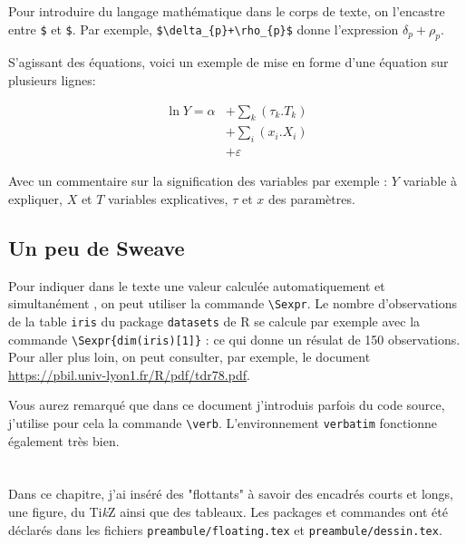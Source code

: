 Pour introduire du langage mathématique dans le corps de texte, on l'encastre entre \verb!$! et \verb!$!. Par exemple, \verb!$\delta_{p}+\rho_{p}$! donne l'expression $\delta_{p}+\rho_{p}$.

S'agissant des équations, voici un exemple de mise en forme d'une équation sur plusieurs lignes: 

\noindent\begin{minipage}{0.53\linewidth} 
\begin{equation}\label{eq:long}
\begin{split}
\ln{Y}= \alpha&+\sum_{k}(\tau_{k}.T_{k})\\
&+\sum_{i}(x_{i}.X_{i})\\
&+\varepsilon
\end{split}
\end{equation}
\end{minipage}
\hfill
\begin{minipage}{0.38\linewidth} 
{\footnotesize
Avec un commentaire sur la signification des variables par exemple : $Y$ variable à expliquer, $X$ et $T$ variables explicatives, $\tau$ et $x$ des paramètres.
}
\end{minipage}

\section{Un peu de Sweave}\label{sec:33}

Pour indiquer dans le texte une valeur calculée automatiquement et simultanément  \R{}, on peut utiliser la commande \verb!\Sexpr!. Le nombre d'observations de la table \verb!iris! du package \verb!datasets! de R se calcule par exemple avec la commande \verb!\!\verb!Sexpr{dim(iris)[1]}!  : ce qui donne un résulat de \num{150} observations. Pour aller plus loin, on peut consulter, par exemple, le document \url{https://pbil.univ-lyon1.fr/R/pdf/tdr78.pdf}.

Vous aurez remarqué que dans ce document j'introduis parfois du code source, j'utilise pour cela la commande \verb!\verb!. L'environnement \verb!verbatim! fonctionne également très bien. 
\chapter[Flottants]{ \label{chap:2}}%
\glsresetall

Dans ce chapitre, j'ai inséré des "flottants" à savoir des encadrés courts et longs, une figure, du Ti\textit{k}Z ainsi que des tableaux. Les packages et commandes ont été déclarés dans les fichiers \verb!preambule/floating.tex! et \verb!preambule/dessin.tex!.

